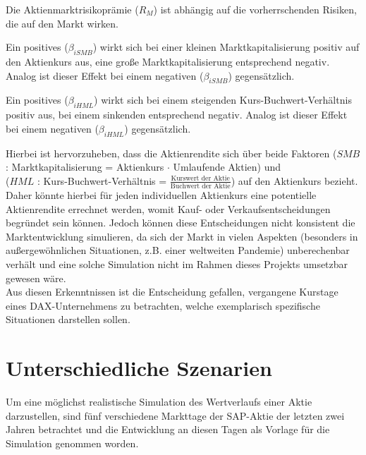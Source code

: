 Die Aktienmarktrisikoprämie ($R_M$) ist abhängig auf die vorherrschenden Risiken, die auf den Markt wirken. 

Ein positives ($\beta_{iSMB}$) wirkt sich bei einer kleinen Marktkapitalisierung positiv auf den Aktienkurs aus, eine große Marktkapitalisierung entsprechend negativ. Analog ist dieser Effekt bei einem negativen ($\beta_{iSMB}$) gegensätzlich.

Ein positives ($\beta_{iHML}$) wirkt sich bei einem steigenden Kurs-Buchwert-Verhältnis positiv aus, bei einem sinkenden entsprechend negativ. Analog ist dieser Effekt bei einem negativen ($\beta_{iHML}$) gegensätzlich.

Hierbei ist hervorzuheben, dass die Aktienrendite sich über beide Faktoren ($SMB$ : Marktkapitalisierung = Aktienkurs $\cdot$ Umlaufende Aktien) und \\
($HML$ : Kurs-Buchwert-Verhältnis = $\frac{\text{Kurswert der Aktie}}{\text{Buchwert der Aktie}} $) auf den Aktienkurs bezieht. Daher könnte hierbei für jeden individuellen Aktienkurs eine potentielle Aktienrendite errechnet werden, womit Kauf- oder Verkaufsentscheidungen begründet sein können. Jedoch können diese Entscheidungen nicht konsistent die Marktentwicklung simulieren, da sich der Markt in vielen Aspekten (besonders in außergewöhnlichen Situationen, z.B. einer weltweiten Pandemie) unberechenbar verhält und eine solche Simulation nicht im Rahmen dieses Projekts umsetzbar gewesen wäre.\\
Aus diesen Erkenntnissen ist die Entscheidung gefallen, vergangene Kurstage eines DAX-Unternehmens zu betrachten, welche exemplarisch spezifische Situationen darstellen sollen.

\section{Unterschiedliche Szenarien}

Um eine möglichst realistische Simulation des Wertverlaufs einer Aktie darzustellen, sind fünf verschiedene Markttage der SAP-Aktie der letzten zwei Jahren betrachtet und die Entwicklung an diesen Tagen als Vorlage für die Simulation genommen worden.

